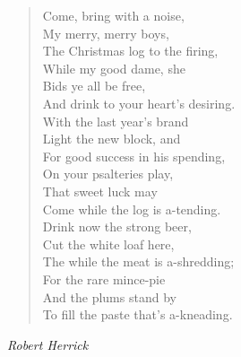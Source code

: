 
\begin{verse}
\hspace*{2em}Come, bring with a noise,\\
\hspace*{2em}My merry, merry boys,\\
The Christmas log to the firing,\\
\hspace*{2em}While my good dame, she\\
\hspace*{2em}Bids ye all be free,\\
And drink to your heart's desiring.\\[0.7em]

\hspace*{2em}With the last year's brand\\
\hspace*{2em}Light the new block, and\\
For good success in his spending,\\
\hspace*{2em}On your psalteries play,\\
\hspace*{2em}That sweet luck may\\
Come while the log is a-tending.\\[0.7em]

\hspace*{2em}Drink now the strong beer,\\
\hspace*{2em}Cut the white loaf here,\\
The while the meat is a-shredding;\\
\hspace*{2em}For the rare mince-pie\\
\hspace*{2em}And the plums stand by\\
To fill the paste that's a-kneading.%
\end{verse}

\vspace{0.5\baselineskip}
\noindent\textit{Robert Herrick}

\newpage
